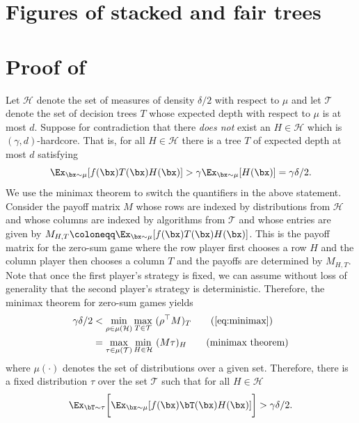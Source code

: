 \section{Figures of stacked and fair trees}
\label{app:figures}








\section{Proof of~}
\label{appendix:hardcore}
Let $\mathcal{H}$ denote the set of measures of density $\delta/2$ with respect to $\mu$ and let $\mathcal{T}$ denote the set of decision trees $T$ whose expected depth with respect to $\mu$ is at most $d$. Suppose for contradiction that there \textit{does not} exist an $H\in\mathcal{H}$ which is $(\gamma,d)$-hardcore. That is, for all $H\in\mathcal{H}$ there is a tree $T$ of expected depth at most $d$ satisfying
\begin{equation}
\label{eq:minimax}
\Ex_{\bx\sim\mu}[f(\bx)T(\bx)H(\bx)]>\gamma\Ex_{\bx\sim\mu}[H(\bx)]=\gamma\delta/2.
\end{equation}
We use the minimax theorem to switch the quantifiers in the above statement. Consider the payoff matrix $M$ whose rows are indexed by distributions from $\mathcal{H}$ and whose columns are indexed by algorithms from $\mathcal{T}$ and whose entries are given by $M_{H,T}\coloneqq \Ex_{\bx\sim\mu}[f(\bx)T(\bx)H(\bx)]$. This is the payoff matrix for the zero-sum game where the row player first chooses a row $H$ and the column player then chooses a column $T$ and the payoffs are determined by $M_{H,T}$. Note that once the first player's strategy is fixed, we can assume without loss of generality that the second player's strategy is deterministic. Therefore, the minimax theorem for zero-sum games yields
\begin{align*}
    \gamma\delta/2&<\min_{\rho\in\mu(\mathcal{H})}\max_{T\in\mathcal{T}}~ (\rho^{\top} M)_T\tag{\Cref{eq:minimax}}\\
    &=\max_{\tau\in\mu(\mathcal{T})}\min_{H\in\mathcal{H}}~(M\tau)_H\tag{minimax theorem}
\end{align*}
where $\mu(\cdot)$ denotes the set of distributions over a given set. Therefore, there is a fixed distribution $\tau$ over the set $\mathcal{T}$ such that for all $H\in\mathcal{H}$
\begin{equation}
\label{eq:hardcore}
\Ex_{\bT\sim\tau}\bigg[\Ex_{\bx\sim\mu}[f(\bx)\bT(\bx)H(\bx)]\bigg]>\gamma\delta/2.    
\end{equation}
